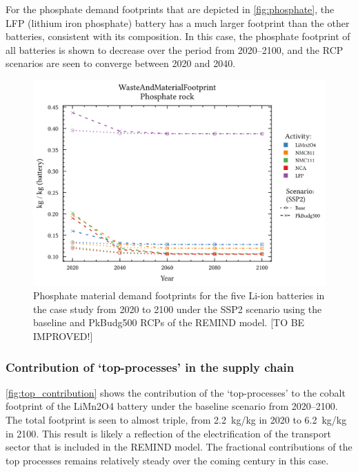 For the phosphate demand footprints that are depicted in \autoref{fig:phosphate}, the LFP (lithium iron phosphate) battery has a much larger footprint than the other batteries, consistent with its composition. In this case, the phosphate footprint of all batteries is shown to decrease over the period from 2020--2100, and the RCP scenarios are seen to converge between 2020 and 2040.

\begin{figure}[H]
    \centering
    \includegraphics[width=0.7\linewidth]{figures/phosphate.png}
    \caption{Phosphate material demand footprints for the five Li-ion batteries in the case study from 2020 to 2100 under the SSP2 scenario using the baseline and PkBudg500 RCPs of the REMIND model. [TO BE IMPROVED!]}\label{fig:phosphate}
\end{figure}

\subsubsection{Contribution of `top-processes' in the supply chain}\label{sec:results-case_study-topprocesses}

\autoref{fig:top_contribution} shows the contribution of the `top-processes' to the cobalt footprint of the LiMn2O4 battery under the baseline scenario from 2020--2100. The total footprint is seen to almost triple, from 2.2~kg/kg in 2020 to 6.2~kg/kg in 2100. This result is likely a reflection of the electrification of the transport sector that is included in the REMIND model. The fractional contributions of the top processes remains relatively steady over the coming century in this case. 

